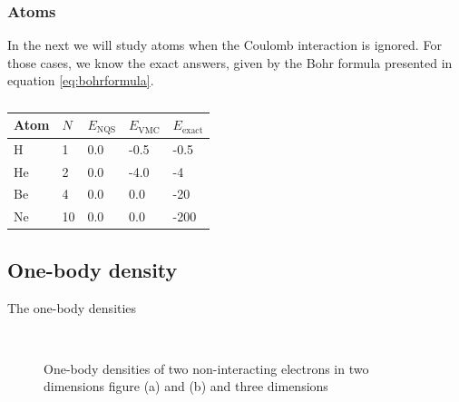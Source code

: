 \subsubsection{Atoms}
In the next we will study atoms when the Coulomb interaction is ignored. For those cases, we know the exact answers, given by the Bohr formula presented in equation \eqref{eq:bohrformula}.
\begin{table} [H]
	\caption{ }
	\begin{tabularx}{\textwidth}{X|X|X:X:X} \hline\hline
		\label{tab:nointeractionatoms}
		Atom & $N$ & $E_{\text{NQS}}$ & $E_{\text{VMC}}$ & $E_{\text{exact}}$ \\ \hline
		H & 1 & 0.0 & -0.5 & -0.5 \\ 
		He & 2 & 0.0 & -4.0 & -4 \\
		Be & 4 & 0.0 & 0.0 & -20 \\
		Ne & 10 & 0.0 & 0.0 & -200 \\ \hline\hline
	\end{tabularx}
\end{table}


\subsection{One-body density}
The one-body densities 
\begin{figure} [H]%
	\centering
	\\
	
	\caption{One-body densities of two non-interacting electrons in two dimensions figure (a) and (b) and three dimensions}%
	\label{fig:OB_nointeraction}
\end{figure}

